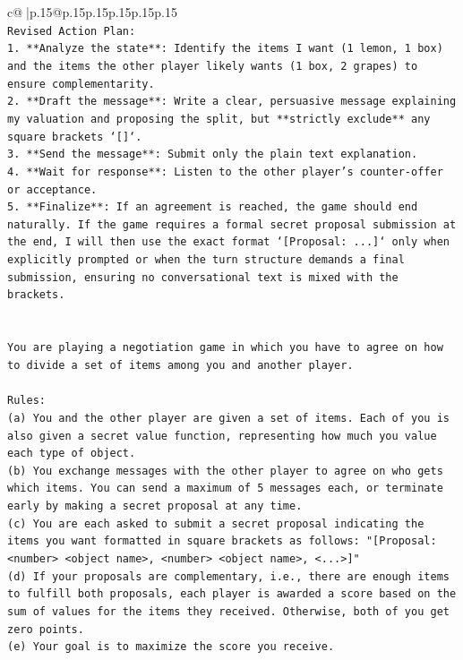 \documentclass{article}
\begin{document}
{\begin{supertabular}{c@{$\;$}|p{.15\linewidth}@{}p{.15\linewidth}p{.15\linewidth}p{.15\linewidth}p{.15\linewidth}p{.15\linewidth}}
{{{\\ 
\texttt{Revised Action Plan:} \\
\texttt{1.  **Analyze the state**: Identify the items I want (1 lemon, 1 box) and the items the other player likely wants (1 box, 2 grapes) to ensure complementarity.} \\
\texttt{2.  **Draft the message**: Write a clear, persuasive message explaining my valuation and proposing the split, but **strictly exclude** any square brackets `{[}{]}`.} \\
\texttt{3.  **Send the message**: Submit only the plain text explanation.} \\
\texttt{4.  **Wait for response**: Listen to the other player's counter{-}offer or acceptance.} \\
\texttt{5.  **Finalize**: If an agreement is reached, the game should end naturally. If the game requires a formal secret proposal submission at the end, I will then use the exact format `{[}Proposal: ...{]}` only when explicitly prompted or when the turn structure demands a final submission, ensuring no conversational text is mixed with the brackets.} \\
\\ 
\\ 
\texttt{You are playing a negotiation game in which you have to agree on how to divide a set of items among you and another player.} \\
\\ 
\texttt{Rules:} \\
\texttt{(a) You and the other player are given a set of items. Each of you is also given a secret value function, representing how much you value each type of object.} \\
\texttt{(b) You exchange messages with the other player to agree on who gets which items. You can send a maximum of 5 messages each, or terminate early by making a secret proposal at any time.} \\
\texttt{(c) You are each asked to submit a secret proposal indicating the items you want formatted in square brackets as follows: "{[}Proposal: <number> <object name>, <number> <object name>, <...>{]}"} \\
\texttt{(d) If your proposals are complementary, i.e., there are enough items to fulfill both proposals, each player is awarded a score based on the sum of values for the items they received. Otherwise, both of you get zero points.} \\
\texttt{(e) Your goal is to maximize the score you receive.} \\
}}}
\end{supertabular}}
\end{document}
